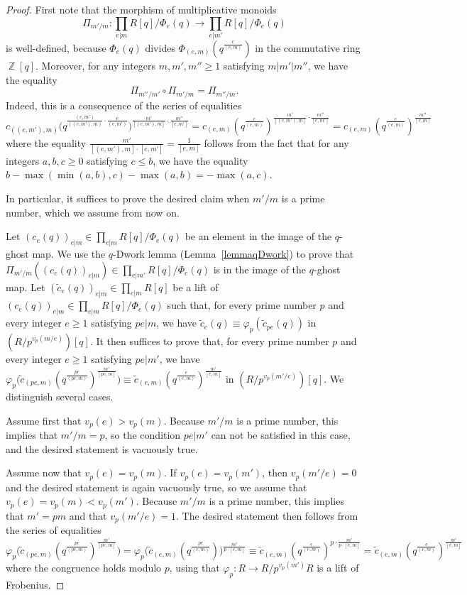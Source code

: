 \documentclass[10pt,a4paper]{amsart}
\DeclareMathOperator{\Z}{\mathbb{Z}}
\renewcommand{\ge}{\geqslant}
\renewcommand{\le}{\leqslant}
\begin{document}
\begin{proof}
    First note that the morphism of multiplicative monoids $$\Pi_{m'/m} : \prod_{e|m} R[q]/\Phi_e(q) \rightarrow \prod_{e|m'} R[q]/\Phi_e(q)$$ is well-defined, because $\Phi_e(q)$ divides $\Phi_{(e,m)}(q^{\frac{e}{(e,m)}})$ in the commutative ring $\Z[q]$. Moreover, for any integers $m,m',m'' \ge 1$ satisfying $m|m'|m''$, we have the equality $$\Pi_{m''/m'} \circ \Pi_{m'/m} = \Pi_{m''/m}.$$ Indeed, this is a consequence of the series of equalities
    $$c_{((e,m'),m)}\big(q^{\frac{(e,m')}{((e,m'),m)}\cdot\frac{e}{(e,m')}}\big)^{\frac{m'}{[(e,m'),m]}\cdot\frac{m''}{[e,m']}} = c_{(e,m)}(q^{\frac{e}{(e,m)}})^{\frac{m'}{[(e,m'),m]}\cdot\frac{m''}{[e,m']}} = c_{(e,m)}(q^{\frac{e}{(e,m)}})^{\frac{m''}{[e,m]}}$$
    where the equality $\tfrac{m'}{[(e,m'),m]\cdot[e,m']}=\tfrac{1}{[e,m]}$ follows from the fact that for any integers $a,b,c \ge 0$ satisfying $c \le b$, we have the equality 
    $b-\max(\min(a,b),c)-\max(a,b)=-\max(a,c)$. 
    
    In particular, it suffices to prove the desired claim when $m'/m$ is a prime number, which we assume from now on.
    
    Let $(c_e(q))_{e|m} \in \prod_{e|m} R[q]/\Phi_e(q)$ be an element in the image of the $q$-ghost map. We use the $q$-Dwork lemma (Lemma~\ref{lemmaqDwork}) to prove that $\Pi_{m'/m}((c_e(q))_{e|m}) \in \prod_{e|m'} R[q]/\Phi_e(q)$ is in the image of the $q$-ghost map. Let $(\tilde{c}_e(q))_{e|m} \in \prod_{e|m} R[q]$ be a lift of $(c_e(q))_{e|m} \in \prod_{e|m} R[q]/\Phi_e(q)$ such that, for every prime number $p$ and every integer $e \ge 1$ satisfying $pe|m$, we have $\tilde{c}_e(q) \equiv \varphi_p(\tilde{c}_{pe}(q))$ in $(R/p^{v_p(m/e)})[q]$. It then suffices to prove that, for every prime number $p$ and every integer $e \ge 1$ satisfying $pe|m'$, we have $\varphi_p\big(\tilde{c}_{(pe,m)}(q^{\frac{pe}{(pe,m)}})^{\frac{m'}{[pe,m]}}\big) \equiv \tilde{c}_{(e,m)}(q^{\frac{e}{(e,m)}})^{\frac{m'}{[e,m]}}$ in $(R/p^{v_p(m'/e)})[q]$. We distinguish several cases.
    
    Assume first that $v_p(e)>v_p(m)$. Because $m'/m$ is a prime number, this implies that $m'/m=p$, so the condition $pe|m'$ can not be satisfied in this case,  
    and the desired statement is vacuously true.

    Assume now that $v_p(e)=v_p(m)$. If $v_p(e)=v_p(m')$, then $v_p(m'/e)=0$ and the desired statement is again vacuously true, so we assume that $v_p(e)=v_p(m)<v_p(m')$. Because $m'/m$ is a prime number, this implies that $m'=pm$ and that $v_p(m'/e)=1$. The desired statement then follows from the series of equalities
    $$\varphi_p\big(\tilde{c}_{(pe,m)}(q^{\frac{pe}{(pe,m)}})^{\frac{m'}{[pe,m]}}\big) = \varphi_p\big(\tilde{c}_{(e,m)}(q^{\frac{pe}{(e,m)}})\big)^{\frac{m'}{p\cdot[e,m]}} \equiv \tilde{c}_{(e,m)}(q^{\frac{e}{(e,m)}})^{p\cdot\frac{m'}{p\cdot [e,m]}} = \tilde{c}_{(e,m)}(q^{\frac{e}{(e,m)}})^{\frac{m'}{[e,m]}}$$
    where the congruence holds modulo $p$, using that $\varphi_p : R \rightarrow R/p^{v_p(m')}R$ is a lift of Frobenius. 


\end{proof}
\end{document}
